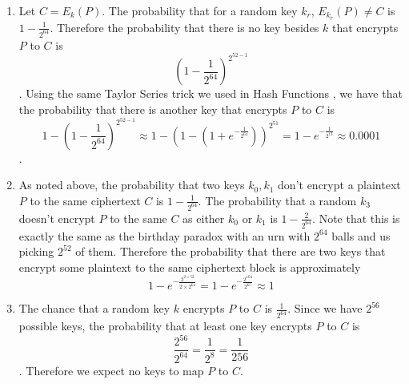 \begin{enumerate}
    \item Let $C = E_k(P)$. The probability that for a random key $k_r$, $E_{k_r}(P) \neq C$ is $1-\frac{1}{2^{64}}$. Therefore the probability that there is no key besides $k$ that encrypts $P$ to $C$ is \[\left(1 - \frac{1}{2^{64}}\right)^{2^{52-1}}\]. Using the same Taylor Series trick we used in Hash Functions \cite{Slides_37}, we have that the probability that there is another key that encrypts $P$ to $C$ is
    \[1 - \left(1 - \frac{1}{2^{64}}\right)^{2^{52-1}} \approx 1 - \left(1 - (1 + e^{-\frac{1}{2^{64}}})\right)^{2^{51}} = 1 - e^{-\frac{1}{2^{13}}} \approx 0.0001\].
    \item As noted above, the probability that two keys $k_0, k_1$ don't encrypt a plaintext $P$ to the same ciphertext $C$ is $1 - \frac{1}{2^{64}}$. The probability that a random $k_3$ doesn't encrypt $P$ to the same $C$ as either $k_0$ or $k_1$ is $1 - \frac{2}{2^{64}}$. Note that this is exactly the same as the birthday paradox \cite{Slides_44} with an urn with $2^{64}$ balls and us picking $2^{52}$ of them. Therefore the probability that there are two keys that encrypt some
    plaintext to the same ciphertext block is approximately \[1 - e^{-\frac{2^{2 \times 52}}{2 \times 2^{64}}} = 1 - e^{-\frac{2^{104}}{2^{65}}} \approx 1\]
    \item The chance that a random key $k$ encrypts $P$ to $C$ is $\frac{1}{2^{64}}$. Since we have $2^{56}$ possible keys, the probability that at least one key encrypts $P$ to $C$ is \[\frac{2^{56}}{2^{64}} = \frac{1}{2^8} = \frac{1}{256}\]. Therefore we expect no keys to map $P$ to $C$. 
\end{enumerate}
